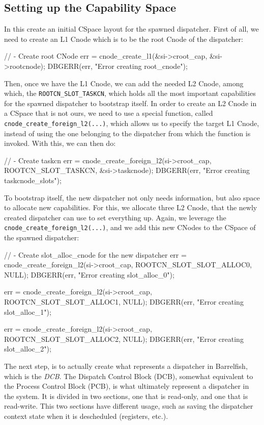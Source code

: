 \documentclass[a4paper,twoside,openright]{report}
\begin{document}
\subsection{Setting up the Capability Space}
\label{sub:setting_up_cspace}
In this create an initial CSpace layout for the spawned dispatcher.
First of all, we need to create an L1 Cnode which is to be the root Cnode of the dispatcher:
\begin{pandacode}
    // - Create root CNode
    err = cnode_create_l1(&si->croot_cap, &si->rootcnode);
    DBGERR(err, "Error creating root_cnode\n");
\end{pandacode} 
Then, once we have the L1 Cnode, we can add the needed L2 Cnode, among which, the \texttt{ROOTCN\_SLOT\_TASKCN}, which holds all the most important capabilities for the spawned dispatcher to bootstrap itself.
In order to create an L2 Cnode in a CSpace that is not ours, we need to use a special function, called \texttt{cnode\_create\_foreign\_l2(...)}, which allows us to specify the target L1 Cnode, instead of using the one belonging to the dispatcher from which the function is invoked.
With this, we can then do:
\begin{pandacode}
    // - Create taskcn
    err = cnode_create_foreign_l2(si->croot_cap, ROOTCN_SLOT_TASKCN, &si->taskcnode);
    DBGERR(err, "Error creating taskcnode_slots\n");
\end{pandacode} 
To bootstrap itself, the new dispatcher not only needs information, but also space to allocate new capabilities.
For this, we allocate three L2 Cnode, that the newly created dispatcher can use to set everything up.
Again, we leverage the \texttt{cnode\_create\_foreign\_l2(...)}, and we add this new CNodes to the CSpace of the spawned dispatcher:
\begin{pandacode}
    // - Create slot_alloc_cnode for the new dispatcher
    err = cnode_create_foreign_l2(si->croot_cap, ROOTCN_SLOT_SLOT_ALLOC0, NULL);
    DBGERR(err, "Error creating slot_alloc_0\n");

    err = cnode_create_foreign_l2(si->croot_cap, ROOTCN_SLOT_SLOT_ALLOC1, NULL);
    DBGERR(err, "Error creating slot_alloc_1\n");

    err = cnode_create_foreign_l2(si->croot_cap, ROOTCN_SLOT_SLOT_ALLOC2, NULL);
    DBGERR(err, "Error creating slot_alloc_2\n");
\end{pandacode} 

The next step, is to actually create what represents a dispatcher in Barrelfish, which is the \emph{DCB}.
The Dispatch Control Block (DCB), somewhat equivalent to the Process Control Block (PCB), is what ultimately represent a dispatcher in the system. It is divided in two sections, one that is read-only, and one that is read-write.
This two sections have different usage, such as saving the dispatcher context state when it is descheduled (registers, etc.).
\end{document}
